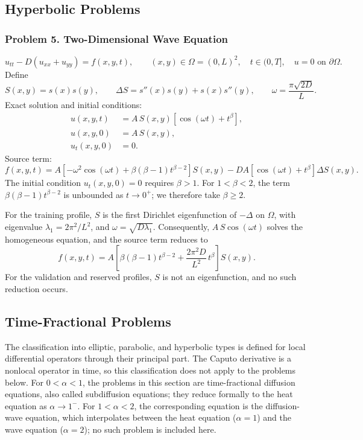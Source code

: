 \documentclass[11pt]{article}
\begin{document}
\subsection{Hyperbolic Problems}

\subsubsection*{Problem 5. Two-Dimensional Wave Equation}

\[
\boxed{u_{tt}-D(u_{xx}+u_{yy})=f(x,y,t)},
\qquad (x,y)\in\Omega=(0,L)^2,
\quad t\in(0,T],
\quad u=0 \text{ on } \partial\Omega .
\]
Define
\[
S(x,y)=s(x)s(y),
\qquad
\Delta S=s''(x)s(y)+s(x)s''(y),
\qquad
\omega=\frac{\pi\sqrt{2D}}{L}.
\]
Exact solution and initial conditions:
\[
\begin{aligned}
u(x,y,t)&=A\,S(x,y)\left[\cos(\omega t)+t^\beta\right],\\
u(x,y,0)&=A\,S(x,y),\\
u_t(x,y,0)&=0.
\end{aligned}
\]
Source term:
\[
f(x,y,t)
=A\left[
-\omega^2\cos(\omega t)
+\beta(\beta-1)t^{\beta-2}
\right]S(x,y)
-DA\left[\cos(\omega t)+t^\beta\right]\Delta S(x,y).
\]
The initial condition $u_t(x,y,0)=0$ requires $\beta>1$. For
$1<\beta<2$, the term $\beta(\beta-1)t^{\beta-2}$ is unbounded as
$t\to0^+$; we therefore take $\beta\ge2$.

For the training profile, $S$ is the first Dirichlet eigenfunction of
$-\Delta$ on $\Omega$, with eigenvalue $\lambda_1=2\pi^2/L^2$, and
$\omega=\sqrt{D\lambda_1}$. Consequently, $A\,S\cos(\omega t)$ solves the
homogeneous equation, and the source term reduces to
\[
f(x,y,t)=A\left[\beta(\beta-1)t^{\beta-2}+\frac{2\pi^2D}{L^2}\,t^\beta\right]S(x,y).
\]
For the validation and reserved profiles, $S$ is not an eigenfunction,
and no such reduction occurs.

\subsection{Time-Fractional Problems}

The classification into elliptic, parabolic, and hyperbolic types is
defined for local differential operators through their principal part.
The Caputo derivative is a nonlocal operator in time, so this
classification does not apply to the problems below. For $0<\alpha<1$,
the problems in this section are time-fractional diffusion equations,
also called subdiffusion equations; they reduce formally to the heat
equation as $\alpha\to1^-$. For $1<\alpha<2$, the corresponding
equation is the diffusion-wave equation, which interpolates between the
heat equation ($\alpha=1$) and the wave equation ($\alpha=2$); no such
problem is included here.
\end{document}
